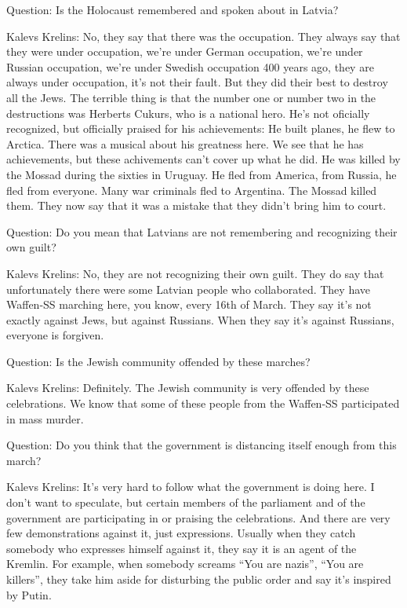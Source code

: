 Question: Is the Holocaust remembered and spoken about in Latvia? 

Kalevs Krelins: No, they say that there was the occupation. They always say that they were under occupation, we’re under German occupation, we’re under Russian occupation, we’re under Swedish occupation 400 years ago, they are always under occupation, it's not their fault. But they did their best to destroy all the Jews. The terrible thing is that the number one or number two in the destructions was Herberts Cukurs, who is a national hero. He's not oficially recognized, but officially praised for his achievements: He built planes, he flew to Arctica. There was a musical about his greatness here. We see that he has achievements, but these achivements can’t cover up what he did. He was killed by the Mossad during the sixties in Uruguay. He fled from America, from Russia, he fled from everyone. Many war criminals fled to Argentina. The Mossad killed them. They now say that it was a mistake that they didn't bring him to court. 

Question: Do you mean that Latvians are not remembering and recognizing their own guilt? 

Kalevs Krelins: No, they are not recognizing their own guilt. They do say that unfortunately there were some Latvian people who collaborated. They have Waffen-SS marching here, you know, every 16th of March. They say it's not exactly against Jews, but against Russians. When they say it's against Russians, everyone is forgiven. 

Question: Is the Jewish community offended by these marches?   

Kalevs Krelins: Definitely. The Jewish community is very offended by these celebrations. We know that some of these people from the Waffen-SS participated in mass murder.   

 

Question: Do you think that the government is distancing itself enough from this march?  

Kalevs Krelins: It’s very hard to follow what the government is doing here. I don’t want to speculate, but certain members of the parliament and of the government are participating in or praising the celebrations. And there are very few demonstrations against it, just expressions. Usually when they catch somebody who expresses himself against it, they say it is an agent of the Kremlin.  For example, when somebody screams “You are nazis”, “You are killers”, they take him aside for disturbing the public order and say it’s inspired by Putin.  

